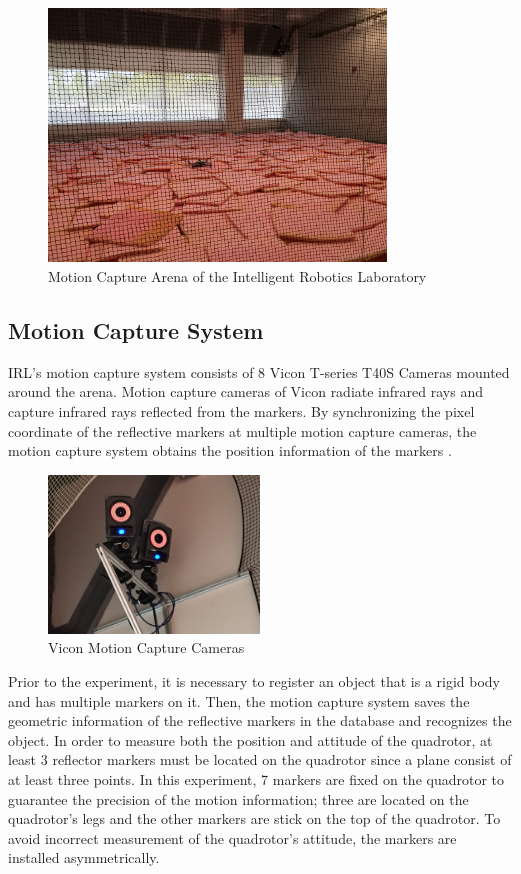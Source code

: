 \begin{figure}
    \centering
    \includegraphics[width=0.8\textwidth]{graphics/arena.jpg}
    \caption{Motion Capture Arena of the Intelligent Robotics Laboratory}
    \label{fig:arena}
\end{figure}

\subsection{Motion Capture System}
IRL's motion capture system consists of 8 Vicon T-series T40S Cameras mounted around the arena. Motion capture cameras of Vicon radiate infrared rays and capture infrared rays reflected from the markers. By synchronizing the pixel coordinate of the reflective markers at multiple motion capture cameras, the motion capture system obtains the position information of the markers \cite{vicon}.

\begin{figure}
    \centering
    \includegraphics[width=0.5\textwidth]{graphics/vicon_camera.jpg}
    \caption{Vicon Motion Capture Cameras}
    \label{fig:arena}
\end{figure}

Prior to the experiment, it is necessary to register an object that is a rigid body and has multiple markers on it. Then, the motion capture system saves the geometric information of the reflective markers in the database and recognizes the object. In order to measure both the position and attitude of the quadrotor, at least 3 reflector markers must be located on the quadrotor since a plane consist of at least three points. In this experiment, 7 markers are fixed on the quadrotor to guarantee the precision of the motion information; three are located on the quadrotor's legs and the other markers are stick on the top of the quadrotor. To avoid incorrect measurement of the quadrotor's attitude, the markers are installed asymmetrically.

